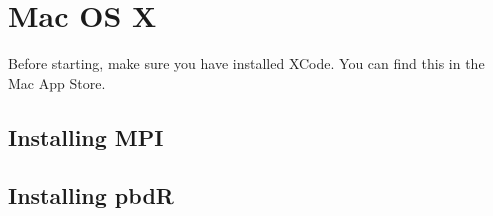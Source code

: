 \section{Mac OS X}

Before starting, make sure you have installed XCode.  You can find this in the Mac App Store.


\subsection{Installing MPI}


\subsection{Installing pbdR}

